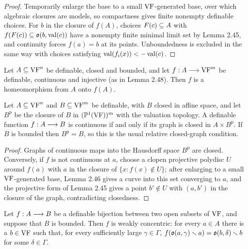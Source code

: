 \begin{proof}
\leanok
Temporarily enlarge the base to a small $\mathrm{VF}$-generated base, over which algebraic closures are models, so compactness gives finite nonempty definable choices. For $b$ in the closure of $f(A)$, choices $F(c) \subseteq A$ with $f(F(c)) \subseteq \mathfrak{o}(b, \operatorname{val}(c))$ have a nonempty finite minimal limit set by Lemma 2.45, and continuity forces $f(a) = b$ at its points. Unboundedness is excluded in the same way with choices satisfying $\operatorname{val}(f_i(x)) < -\operatorname{val}(c)$.
\end{proof}

\setcounter{theorem}{48}
\begin{corollary}
\label{conti-homeo}
\leanok
{}
Let $A \subseteq \mathrm{VF}^n$ be definable, closed and bounded, and let $f : A \longrightarrow \mathrm{VF}^m$ be definable, continuous and injective (as in Lemma 2.48). Then $f$ is a homeomorphism from $A$ onto $f(A)$.
\end{corollary}

\setcounter{theorem}{49}
\begin{lemma}
\label{closed-gra}
\leanok
Let $A \subseteq \mathrm{VF}^n$ and $B \subseteq \mathrm{VF}^m$ be definable, with $B$ closed in affine space, and let $B^{\mathrm{p}}$ be the closure of $B$ in $(\mathbb{P}^1(\mathrm{VF}))^m$ with the valuation topology. A definable function $f : A \longrightarrow B$ is continuous if and only if its graph is closed in $A \times B^{\mathrm{p}}$. If $B$ is bounded then $B^{\mathrm{p}} = B$, so this is the usual relative closed-graph condition.
\end{lemma}

\begin{proof}
\leanok
Graphs of continuous maps into the Hausdorff space $B^{\mathrm{p}}$ are closed. Conversely, if $f$ is not continuous at $a$, choose a clopen projective polydisc $U$ around $f(a)$ with $a$ in the closure of $\{x : f(x) \notin U\}$; after enlarging to a small $\mathrm{VF}$-generated base, Lemma 2.46 gives a curve into this set converging to $a$, and the projective form of Lemma 2.45 gives a point $b' \notin U$ with $(a, b')$ in the closure of the graph, contradicting closedness.
\end{proof}

\setcounter{theorem}{50}
\begin{lemma}
\label{lim-weak}
\leanok
{}
Let $f : A \longrightarrow B$ be a definable bijection between two open subsets of $\mathrm{VF}$, and suppose that $B$ is bounded. Then $f$ is weakly concentric: for every $a \in A$ there is a $b \in \mathrm{VF}$ such that, for every sufficiently large $\gamma \in \Gamma$, $f(\mathfrak{o}(a,\gamma) \smallsetminus a) = \mathfrak{o}(b,\delta) \smallsetminus b$ for some $\delta \in \Gamma$.
\end{lemma}

